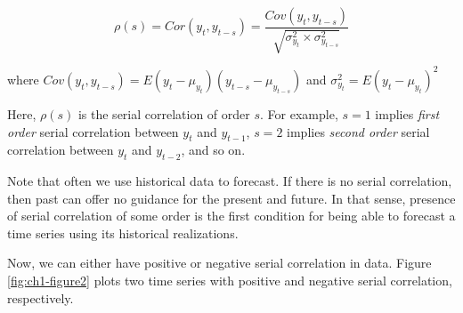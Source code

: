 \documentclass[]{book}
\theoremstyle{definition}
\theoremstyle{definition}
\theoremstyle{definition}
\theoremstyle{remark}
\begin{document}
\begin{equation}
\rho(s)=Cor(y_t, y_{t-s}) =\frac{   Cov(y_t,y_{t-s})}{\sqrt{\sigma^2_{y_t} \times \sigma^2_{y_{t-s}}}}
\label{eq:sercor}
\end{equation}

where \(Cov(y_t,y_{t-s})= E(y_t-\mu_{y_t})(y_{t-s}-\mu_{y_{t-s}})\) and
\(\sigma^2_{y_t}=E(y_t-\mu_{y_t})^2\)

Here, \(\rho(s)\) is the serial correlation of order \(s\). For example,
\(s=1\) implies \emph{first order} serial correlation between \(y_t\)
and \(y_{t-1}\), \(s=2\) implies \emph{second order} serial correlation
between \(y_t\) and \(y_{t-2}\), and so on.

Note that often we use historical data to forecast. If there is no
serial correlation, then past can offer no guidance for the present and
future. In that sense, presence of serial correlation of some order is
the first condition for being able to forecast a time series using its
historical realizations.

Now, we can either have positive or negative serial correlation in data.
Figure \ref{fig:ch1-figure2} plots two time series with positive and
negative serial correlation, respectively.
\end{document}
